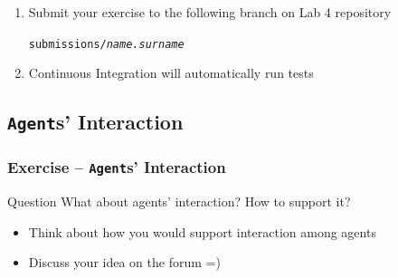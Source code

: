 \documentclass[presentation]{beamer}\mode<presentation>{\usetheme{AMSCesenaPurpleAndGold}}
\newcommand{\labN}{4}
\begin{document}
\begin{frame}[c, allowframebreaks]
\begin{enumerate}
        \bigskip

        \item Submit your exercise to the following branch on Lab \labN{} repository
        \begin{center}
            \texttt{submissions/\textit{name.surname}}
        \end{center}

        \bigskip

        \item Continuous Integration will automatically run tests
    \end{enumerate}

\end{frame}

\startExercise

\subsection{\texttt{Agent}s' Interaction}

\begin{frame}[c]
    \frametitle{Exercise \currentExercise{} -- \texttt{Agent}s' Interaction}

    \begin{block}{Question}\centering
        What about agents' \alert{interaction}? How to support it?
    \end{block}

    \vfill

    \begin{itemize}
        \item Think about how you would support interaction among agents

        \vfill

        \item Discuss your idea on the forum =)
    \end{itemize}

\end{frame}



\section*{}
\end{document}
